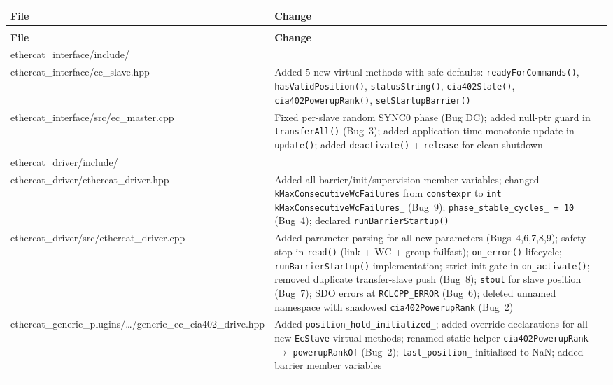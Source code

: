 \documentclass[11pt,a4paper]{article}
\begin{document}
\begin{longtable}{@{}>{\ttfamily\small}p{7cm} p{8.5cm}@{}}
  \toprule
  \normalfont\textbf{File} & \normalfont\textbf{Change} \\
  \midrule
  \endfirsthead
  \multicolumn{2}{c}{\small\itshape (continued)} \\
  \toprule
  \normalfont\textbf{File} & \normalfont\textbf{Change} \\
  \midrule
  \endhead
  \bottomrule
  \endlastfoot

  ethercat\_interface/include/\\ethercat\_interface/ec\_slave.hpp &
    Added 5 new virtual methods with safe defaults:
    \texttt{readyForCommands()}, \texttt{hasValidPosition()},
    \texttt{statusString()}, \texttt{cia402State()},
    \texttt{cia402PowerupRank()}, \texttt{setStartupBarrier()} \\
  \addlinespace

  ethercat\_interface/src/ec\_master.cpp &
    Fixed per-slave random SYNC0 phase (Bug DC); added null-ptr guard in
    \texttt{transferAll()} (Bug~3); added application-time monotonic update
    in \texttt{update()}; added \texttt{deactivate()} + \texttt{release}
    for clean shutdown \\
  \addlinespace

  ethercat\_driver/include/\\ethercat\_driver/ethercat\_driver.hpp &
    Added all barrier/init/supervision member variables; changed
    \texttt{kMaxConsecutiveWcFailures} from \texttt{constexpr} to
    \texttt{int kMaxConsecutiveWcFailures\_} (Bug~9);
    \texttt{phase\_stable\_cycles\_ = 10} (Bug~4);
    declared \texttt{runBarrierStartup()} \\
  \addlinespace

  ethercat\_driver/src/ethercat\_driver.cpp &
    Added parameter parsing for all new parameters (Bugs~4,6,7,8,9);
    safety stop in \texttt{read()} (link + WC + group failfast);
    \texttt{on\_error()} lifecycle;
    \texttt{runBarrierStartup()} implementation;
    strict init gate in \texttt{on\_activate()};
    removed duplicate transfer-slave push (Bug~8);
    \texttt{stoul} for slave position (Bug~7);
    SDO errors at \texttt{RCLCPP\_ERROR} (Bug~6);
    deleted unnamed namespace with shadowed \texttt{cia402PowerupRank} (Bug~2) \\
  \addlinespace

  ethercat\_generic\_plugins/\ldots/generic\_ec\_cia402\_drive.hpp &
    Added \texttt{position\_hold\_initialized\_};
    added override declarations for all new \texttt{EcSlave} virtual methods;
    renamed static helper \texttt{cia402PowerupRank} $\to$
    \texttt{powerupRankOf} (Bug~2);
    \texttt{last\_position\_} initialised to NaN;
    added barrier member variables \\
  \addlinespace


\end{longtable}
\end{document}
